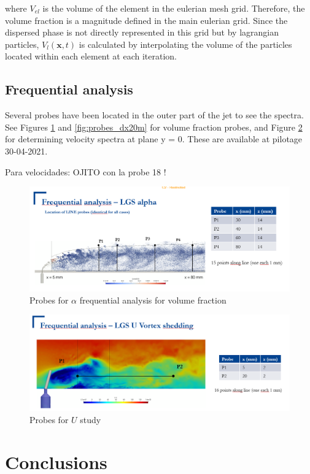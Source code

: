 where $V_{el}$ is the volume of the element in the eulerian mesh grid. Therefore, the volume fraction is a magnitude defined in the main eulerian grid. Since the dispersed phase is not directly represented in this grid but by lagrangian particles, $V_l \left( \textbf{x}, t \right)$ is calculated by interpolating the volume of the particles located within each element at each iteration.

\subsection{Frequential analysis}

Several probes have been located in the outer part of the jet to see the spectra. See Figures \ref{fig:probes_dx10m} and \ref{fig:probes_dx20m} for volume fraction probes, and Figure \ref{fig:probes_U_planey0} for determining velocity spectra at plane y = 0. These are available at pilotage 30-04-2021.

Para velocidades: OJITO con la probe 18 !

\begin{figure}[h!]
	\centering
	\includegraphics[scale=0.7]{./part2_developments/figures_ch6_lagrangian_JICF/probes_vol_frac}
	\caption{Probes for $\alpha$ frequential analysis for volume fraction}
	\label{fig:probes_dx10m}
\end{figure}


\begin{figure}[h!]
	\centering
	\includegraphics[scale=0.7]{./part2_developments/figures_ch6_lagrangian_JICF/probes_U_planey0}
	\caption{Probes for $U$ study}
	\label{fig:probes_U_planey0}
\end{figure}



\section{Conclusions}